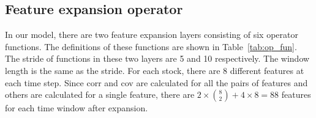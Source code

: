 \documentclass{article}
\begin{document}
\subsection{Feature expansion operator}

\hspace{16}In our model, there are two feature expansion layers consisting of six operator functions. The definitions of these functions are shown in Table~\ref{tab:op_fun}. The stride of functions in these two layers are 5 and 10 respectively. The window length is the same as the stride. For each stock, there are 8 different features at each time step. Since corr and cov are calculated for all the pairs of features and others are calculated for a single feature, there are $2\times\binom{8}{2} + 4 \times 8 = 88$ features for each time window after expansion.
\end{document}
